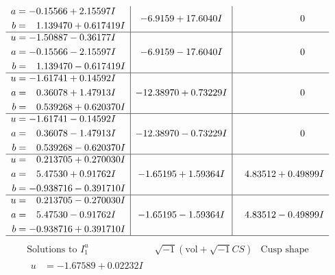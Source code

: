 \documentclass[1p]{elsarticle_modified}
\theoremstyle{definition}
\newcommand{\I}{\sqrt{-1}}
\begin{document}
$$\begin{array}{c|c|c}
\begin{aligned}
a &= -0.15566 + 2.15597 I \\
b &= \phantom{-}1.139470 + 0.617419 I\end{aligned}
 & -6.9159 + 17.6040 I & \phantom{-0.000000 } 0 \\ \hline\begin{aligned}
u &= -1.50887 - 0.36177 I \\
a &= -0.15566 - 2.15597 I \\
b &= \phantom{-}1.139470 - 0.617419 I\end{aligned}
 & -6.9159 - 17.6040 I & \phantom{-0.000000 } 0 \\ \hline\begin{aligned}
u &= -1.61741 + 0.14592 I \\
a &= \phantom{-}0.36078 + 1.47913 I \\
b &= \phantom{-}0.539268 + 0.620370 I\end{aligned}
 & -12.38970 + 0.73229 I & \phantom{-0.000000 } 0 \\ \hline\begin{aligned}
u &= -1.61741 - 0.14592 I \\
a &= \phantom{-}0.36078 - 1.47913 I \\
b &= \phantom{-}0.539268 - 0.620370 I\end{aligned}
 & -12.38970 - 0.73229 I & \phantom{-0.000000 } 0 \\ \hline\begin{aligned}
u &= \phantom{-}0.213705 + 0.270030 I \\
a &= \phantom{-}5.47530 + 0.91762 I \\
b &= -0.938716 - 0.391710 I\end{aligned}
 & -1.65195 + 1.59364 I & \phantom{-}4.83512 + 0.49899 I \\ \hline\begin{aligned}
u &= \phantom{-}0.213705 - 0.270030 I \\
a &= \phantom{-}5.47530 - 0.91762 I \\
b &= -0.938716 + 0.391710 I\end{aligned}
 & -1.65195 - 1.59364 I & \phantom{-}4.83512 - 0.49899 I\\
 \hline 
 \end{array}$$\newpage$$\begin{array}{c|c|c}  
\text{Solutions to }I^u_{1}& \I (\text{vol} + \sqrt{-1}CS) & \text{Cusp shape}\\
 \hline 
\begin{aligned}
u &= -1.67589 + 0.02232 I \\

\end{aligned}
\end{array}$$
\end{document}
